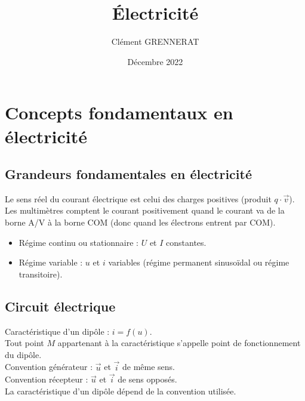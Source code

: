 \documentclass[13pt, twoside, a4paper, french]{report}
\newcommand*{\getSubject}{Électricité}
\begin{document}
    \title{\getSubject}
    \author{Clément GRENNERAT}
    \date{Décembre 2022}
    \pagestyle{non-chapter-style}
    
    
    \chapter{Concepts fondamentaux en électricité}\label{ch:concepts-fondamentaux-en-electricite}
        
        
        \section{Grandeurs fondamentales en électricité}\label{sec:grandeurs-fondamentales-en-electricite}
            
            Le sens réel du courant électrique est celui des charges positives (produit $q \cdot \vec v$).\\
            
            Les multimètres comptent le courant positivement quand le courant va de la borne A/V à la borne COM (donc quand les électrons entrent par COM).\\
            
            \begin{itemize}
                \item Régime continu ou stationnaire : $U$ et $I$ constantes.
                \item Régime variable : $u$ et $i$ variables (régime permanent sinusoïdal ou régime transitoire).
            \end{itemize}
        
        
        \section{Circuit électrique}\label{sec:circuit-electrique}
            
            Caractéristique d'un dipôle : $i = f(u)$.\\
            Tout point $M$ appartenant à la caractéristique s'appelle point de fonctionnement du dipôle.\\
            
            Convention générateur : $\vec u$ et $\vec i$ de même sens.\\
            Convention récepteur : $\vec u$ et $\vec i$ de sens opposés.\\
            La caractéristique d'un dipôle dépend de la convention utilisée.\\
            
\end{document}
